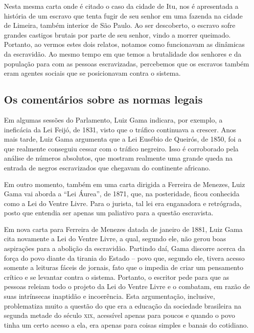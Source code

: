 \documentclass[12pt]{extarticle}
\begin{document}
Nesta mesma carta onde é citado o caso da cidade de Itu, nos é apresentada
a história de um escravo que tenta fugir de seu senhor em uma fazenda
na cidade de Limeira, também interior de São Paulo. Ao ser descoberto, o
escravo sofre grandes castigos brutais por parte de seu senhor, vindo a
morrer queimado. Portanto, ao vermos estes dois relatos, notamos como
funcionavam as dinâmicas da escravidão. Ao mesmo tempo em que temos a
brutalidade dos senhores e da população para com as pessoas
escravizadas, percebemos que os escravos também eram agentes sociais
que se posicionavam contra o sistema.

\subsection{Os comentários sobre as normas legais}

Em algumas sessões do Parlamento, Luiz Gama indicara, por exemplo, a ineficácia
da Lei Feijó, de 1831, visto que o tráfico continuava a crescer.
Anos mais tarde, Luiz Gama argumenta que a Lei Eusébio de Queirós, de
1850, foi a que realmente conseguiu cessar com o tráfico negreiro. 
Isso é corroborado pela análise de números absolutos,
que mostram realmente uma grande queda na entrada de negros escravizados
que chegavam do continente africano.

Em outro momento, também em uma carta dirigida a Ferreira de Menezes,
Luiz Gama vai aborda a ``Lei Áurea'', de 1871, que, na posteridade, ficou
conhecida como a Lei do Ventre Livre. Para o jurista, tal lei era
enganadora e retrógrada, posto que entendia ser apenas um paliativo para
a questão escravista.






Em nova carta para Ferreira de Menezes datada de janeiro de 1881, Luiz
Gama cita novamente a Lei do Ventre Livre, a qual, segundo ele, não gerou
boas aspirações para a abolição da escravidão. Partindo daí, Gama
discorre acerca da força do povo diante da tirania do Estado -- povo que,
segundo ele, tivera acesso somente a leituras fáceis de jornais, fato que
o impedia de criar um pensamento crítico e se levantar contra o sistema.
Portanto, o escritor pede para que as pessoas releiam todo o projeto da
Lei do Ventre Livre e o combatam, em razão de suas intrínsecas inaptidão
e incoerência. Esta argumentação, inclusive, problematiza muito a
questão do que era a educação da sociedade brasileira na segunda metade
do século \textsc{xix}, acessível apenas para poucos e quando o povo tinha um
certo acesso a ela, era apenas para coisas simples e banais do
cotidiano.
\end{document}
